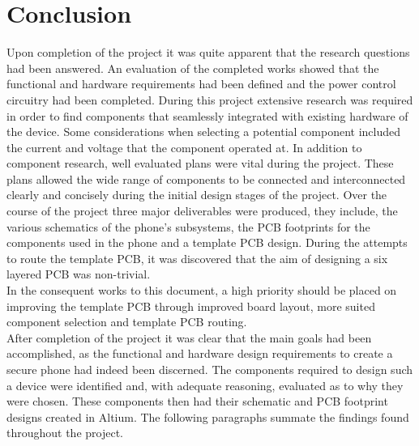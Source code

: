 
\chapter{Conclusion} %

\label{Chapter8} %

	Upon completion of the project it was quite apparent that the research questions had been answered. 
An evaluation of the completed works showed that the functional and hardware requirements had been defined and the power control circuitry had been completed. During this project extensive research was required in order to find components that seamlessly integrated with existing hardware of the device. 
Some considerations when selecting a potential component included the current and voltage that the component operated at. 
In addition to component research, well evaluated plans were vital during the project. 
These plans allowed the wide range of components to be connected and interconnected clearly and concisely during the initial design stages of the project. 
Over the course of the project three major deliverables were produced, they include, the various schematics of the phone's subsystems, the PCB footprints for the components used in the phone and a template PCB design. 
During the attempts to route the template PCB, it was discovered that the aim of designing a six layered PCB was non-trivial.\\
	In the consequent works to this document, a high priority should be placed on improving the template PCB through improved board layout, more suited component selection and template PCB routing. \\

	After completion of the project it was clear that the main goals had been accomplished, as the functional and hardware design requirements to create a secure phone had indeed been discerned. 
The components required to design such a device were identified and, with adequate reasoning, evaluated as to why they were chosen. 
These components then had their schematic and PCB footprint designs created in Altium. 
The following paragraphs summate the findings found throughout the project.\\





